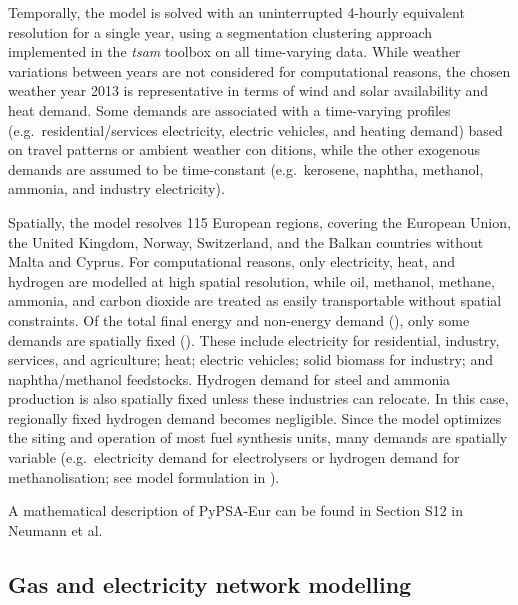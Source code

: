 Temporally, the model is solved with an uninterrupted 4-hourly equivalent
resolution for a single year, using a segmentation clustering approach
implemented in the \textit{tsam} toolbox on all time-varying
data.\cite{hoffmannParetooptimalTemporal2022} While weather variations between
years are not considered for computational reasons, the chosen weather year 2013
is representative in terms of wind and solar availability and heat
demand.\cite{gotskeDesigningSectorcoupledEuropean2024} Some demands are
associated with a time-varying profiles (e.g.~residential/services electricity,
electric vehicles, and heating demand) based on travel patterns or ambient weather
con ditions, while the other exogenous demands are assumed to be time-constant
(e.g.~kerosene, naphtha, methanol, ammonia, and industry electricity). 

Spatially, the model resolves 115 European
regions,\cite{frysztackiStrongEffect2021} covering the European Union, the
United Kingdom, Norway, Switzerland, and the Balkan countries without Malta and
Cyprus. For computational reasons, only electricity, heat, and hydrogen are
modelled at high spatial resolution, while oil, methanol, methane, ammonia, and
carbon dioxide are treated as easily transportable without spatial constraints.
Of the total final energy and non-energy demand
(), only some demands are spatially fixed
(). These include electricity for residential, industry,
services, and agriculture; heat; electric vehicles; solid biomass for industry;
and naphtha/methanol feedstocks. Hydrogen demand for steel and ammonia
production is also spatially fixed unless these industries can relocate. In this
case, regionally fixed hydrogen demand becomes negligible. Since the model
optimizes the siting and operation of most fuel synthesis units, many demands
are spatially variable (e.g.~electricity demand for electrolysers or hydrogen
demand for methanolisation; see model formulation in ).

A mathematical description of PyPSA-Eur can be found in Section S12 in Neumann
et al.\cite{neumannPotentialRoleHydrogen2023}

\subsection*{Gas and electricity network modelling}
\label{sec:methods-networks}

